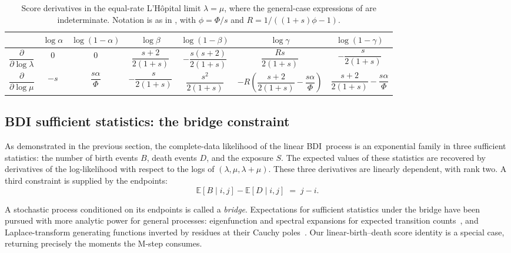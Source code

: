 \documentclass{article}
\newcommand{\BDI}{\textsc{BDI}}
\newcommand{\E}{\mathbb{E}}
\newcommand{\ins}{\lambda}
\newcommand{\del}{\mu}
\begin{document}
\begin{table}[t]
	\caption{Score derivatives in the equal-rate L'H\^opital limit $\ins{=}\del$, where the
		general-case expressions of  are indeterminate. Notation is
		as in , with $\phi{=}\Phi/s$ and $R{=}1/((1{+}s)\phi-1)$.}
	\label{tab:score-derivatives-equal}
	\centering
	\setlength{\tabcolsep}{4pt}
	\begin{tabular}{ccccccc}
		\toprule
		& $\log\alpha$ & $\log(1{-}\alpha)$ & $\log\beta$
		& $\log(1{-}\beta)$ & $\log\gamma$ & $\log(1{-}\gamma)$ \\
		\midrule
		$\dfrac{\partial}{\partial\log\ins}$
		& $0$ & $0$
		& $\dfrac{s+2}{2(1+s)}$
		& $-\dfrac{s(s+2)}{2(1+s)}$
		& $\dfrac{Rs}{2(1+s)}$
		& $-\dfrac{s}{2(1+s)}$ \\
		$\dfrac{\partial}{\partial\log\del}$
		& $-s$ & $\dfrac{s\alpha}{\Phi}$
		& $-\dfrac{s}{2(1+s)}$
		& $\dfrac{s^2}{2(1+s)}$
		& $-R\!\left(\dfrac{s{+}2}{2(1{+}s)}-\dfrac{s\alpha}{\Phi}\right)$
		& $\dfrac{s+2}{2(1+s)}-\dfrac{s\alpha}{\Phi}$ \\
		\bottomrule
	\end{tabular}
\end{table}

\subsection{BDI sufficient statistics: the bridge constraint}

As demonstrated in the previous section, the complete-data likelihood of the 
linear \BDI\ process is an exponential family in three sufficient statistics: 
the number of birth events $B$, death events $D$, and the exposure $S$.
The expected values of these statistics are recovered by derivatives of the log-likelihood with respect to the logs of $(\ins,\del,\ins{+}\del)$.
These three derivatives are linearly dependent, with rank two. A third constraint is supplied by the endpoints:
\begin{equation}
\label{eq:conservation}
\E[B\mid i,j]-\E[D\mid i,j]\;=\;j-i .
\end{equation}

A stochastic process conditioned on its endpoints is called a \emph{bridge}.
Expectations for sufficient statistics under the bridge have been
pursued with more analytic power for general processes: eigenfunction
and spectral expansions for expected transition
counts~\cite{MininSuchard2008}, and Laplace-transform generating
functions inverted by residues at their Cauchy
poles~\cite{CrawfordSuchard2012,CrawfordMininSuchard2014}. Our
linear-birth--death score identity is a special case,
returning precisely the moments the M-step consumes. 
\end{document}
